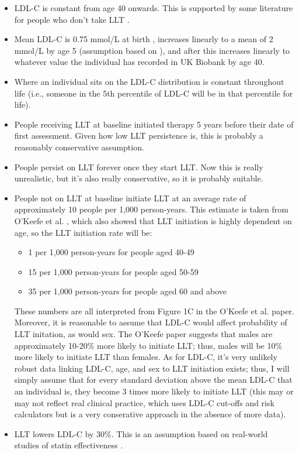 \documentclass[11pt]{article}
\begin{document}
\begin{itemize}
\item LDL-C is constant from age 40 onwards. This is supported by some literature 
for people who don't take LLT \cite{DuncanJAHA2019}. 
\item Mean LDL-C is 0.75 mmol/L  at birth \cite{DescampsAth2004}, 
increases linearly to a mean of 2 mmol/L by age 5
(assumption based on \cite{KitJAMA2012}), and after this increases linearly to whatever value
the individual has recorded in UK Biobank by age 40. 
\item Where an individual sits on the LDL-C distribution is constant throughout life (i.e., someone in the 
5th percentile of LDL-C will be in that percentile for life). 
\item People receiving LLT at baseline initiated therapy 5 years before their date of first assessment. 
Given how low LLT persistence is, \cite{TothLHD2019,TalicCDT2021,OforiJOG2017} 
this is probably a reasonably conservative assumption.
\item People persist on LLT forever once they start LLT. Now this is really unrealistic, 
but it's also really conservative, so it is probably suitable. 
\item People not on LLT at baseline initiate LLT at an average rate of approximately 10 people
per 1,000 person-years. This estimate is taken from O'Keefe et al. \cite{OKeefeCLINEPI2016}, which also showed that LLT initiation
is highly dependent on age, so the LLT initiation rate will be:
\begin{itemize}
\item 1 per 1,000 person-years for people aged 40-49
\item 15 per 1,000 person-years for people aged 50-59
\item 35 per 1,000 person-years for people aged 60 and above
\end{itemize}
These numbers are all interpreted from Figure 1C in the O'Keefe et al. paper. Moreover, it is reasonable to assume that
LDL-C would affect probability of LLT initation, as would sex. The O'Keefe paper suggests that males are approximately 10-20\%
more likely to initiate LLT; thus, males will be 10\% more likely to initiate LLT than females. 
As for LDL-C, it's very unlikely robust data linking LDL-C, age, and sex to LLT initiation exists; 
thus, I will simply assume that for every standard deviation above the mean LDL-C that an individual is, 
they become 3 times more likely to initiate LLT (this may or may not reflect real clinical practice, 
which uses LDL-C cut-offs and risk calculators but is a very conserative approach in the absence of 
more data). 
\item LLT lowers LDL-C by 30\%. This is an assumption based on real-world studies of statin 
effectiveness \cite{FangLHD2021,BacquerEJPC2020}.
\end{itemize}
\end{document}

